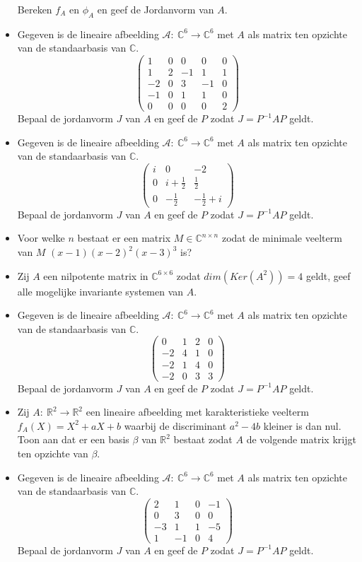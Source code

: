 \documentclass[main.tex]{subfiles}
\begin{document}
\begin{itemize}
  Bereken $f_{A}$ en $\phi_{A}$ en geef de Jordanvorm van $A$.
\item Gegeven is de lineaire afbeelding $\mathcal{A}:\ \mathbb{C}^{6} \rightarrow \mathbb{C}^{6}$ met $A$ als matrix ten opzichte van de standaarbasis van $\mathbb{C}$.
  \[
  \begin{pmatrix}
      1 & 0 & 0 & 0 & 0\\
      1 & 2 & -1 & 1 & 1\\
      -2 & 0 & 3 & -1 &0\\
      -1 & 0 & 1 & 1 & 0\\
      0 & 0 & 0 & 0 & 2
  \end{pmatrix}
  \]
  Bepaal de jordanvorm $J$ van $A$ en geef de $P$ zodat $J=P^{-1}AP$ geldt.
\item Gegeven is de lineaire afbeelding $\mathcal{A}:\ \mathbb{C}^{6} \rightarrow \mathbb{C}^{6}$ met $A$ als matrix ten opzichte van de standaarbasis van $\mathbb{C}$.
  \[
  \begin{pmatrix}
    i & 0 & -2\\
    0 & i+\frac{1}{2} & \frac{1}{2}\\
    0 & -\frac{1}{2} & -\frac{1}{2}+i
  \end{pmatrix}
  \]
  Bepaal de jordanvorm $J$ van $A$ en geef de $P$ zodat $J=P^{-1}AP$ geldt.
\item Voor welke $n$ bestaat er een matrix $M\in \mathbb{C}^{n\times n}$ zodat de minimale veelterm van $M$ $(x-1)(x-2)^{2}(x-3)^{3}$ is?
\item Zij $A$ een nilpotente matrix in $\mathbb{C}^{6\times 6}$ zodat $dim(Ker(A^{2}))=4$ geldt, geef alle mogelijke invariante systemen van $A$.
\item Gegeven is de lineaire afbeelding $\mathcal{A}:\ \mathbb{C}^{6} \rightarrow \mathbb{C}^{6}$ met $A$ als matrix ten opzichte van de standaarbasis van $\mathbb{C}$.
  \[
  \begin{pmatrix}
    0 & 1 & 2 & 0\\
    -2 & 4 & 1 & 0\\
    -2 & 1 & 4  &0\\
    -2 & 0 & 3 &3
  \end{pmatrix}
  \]
  Bepaal de jordanvorm $J$ van $A$ en geef de $P$ zodat $J=P^{-1}AP$ geldt.
\item Zij $A:\ \mathbb{R}^{2}\rightarrow \mathbb{R}^{2}$ een lineaire afbeelding met karakteristieke veelterm $f_{A}(X)=X^{2}+aX+b$ waarbij de discriminant $a^{2}-4b$ kleiner is dan nul.
  Toon aan dat er een basis $\beta$ van $\mathbb{R}^{2}$ bestaat zodat $A$ de volgende matrix krijgt ten opzichte van $\beta$.
\item Gegeven is de lineaire afbeelding $\mathcal{A}:\ \mathbb{C}^{6} \rightarrow \mathbb{C}^{6}$ met $A$ als matrix ten opzichte van de standaarbasis van $\mathbb{C}$.
  \[
  \begin{pmatrix}
    2 & 1 & 0 & -1\\
    0 & 3 & 0 & 0\\
    -3 & 1 & 1 &-5\\
    1 & -1 & 0 & 4
  \end{pmatrix}
  \]
  Bepaal de jordanvorm $J$ van $A$ en geef de $P$ zodat $J=P^{-1}AP$ geldt.
\end{itemize}
\end{document}
